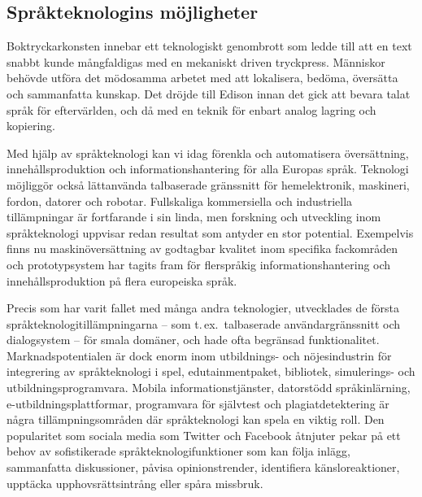 \begin{multicols}{2}
\subsection{Språkteknologins möjligheter}

Boktryckarkonsten innebar ett teknologiskt genombrott som ledde till
att en text snabbt kunde mångfaldigas med en mekaniskt driven
tryckpress. Människor behövde utföra det mödosamma arbetet med att
lokalisera, bedöma, översätta och sammanfatta kunskap. Det dröjde till
Edison innan det gick att bevara talat språk för eftervärlden, och då
med en teknik för enbart analog lagring och kopiering.

Med hjälp av språkteknologi kan vi idag förenkla och automatisera
översättning, innehållsproduktion och informationshantering för alla
Europas språk. Teknologi möjliggör också lättanvända talbaserade
gränssnitt för hemelektronik, maskineri, fordon, datorer och
robotar. Fullskaliga kommersiella och industriella tillämpningar är
fortfarande i sin linda, men forskning och utveckling inom
språkteknologi uppvisar redan resultat som antyder en stor
potential. Exempelvis finns nu maskinöversättning av godtagbar
kvalitet inom specifika fackområden och prototypsystem har tagits fram
för flerspråkig informationshantering och innehållsproduktion på flera
europeiska språk.


Precis som har varit fallet med många andra teknologier, utvecklades
de första språkteknologitillämpningarna -- som t.\,ex.~talbaserade
användargränssnitt och dialogsystem -- för smala domäner, och hade
ofta begränsad funktionalitet. Marknadspotentialen är dock enorm inom
utbildnings- och nöjesindustrin för integrering av språkteknologi i
spel, edutainmentpaket, bibliotek, simulerings- och
utbildningsprogramvara. Mobila informationstjänster, datorstödd
språkinlärning, e-utbildningsplattformar, programvara för självtest
och plagiatdetektering är några tillämpningsområden där språkteknologi
kan spela en viktig roll. Den popularitet som sociala media som
Twitter och Facebook åtnjuter pekar på ett behov av sofistikerade
språkteknologifunktioner som kan följa inlägg, sammanfatta
diskussioner, påvisa opinionstrender, identifiera känsloreaktioner,
upptäcka upphovsrättsintrång eller spåra missbruk.


\end{multicols}
